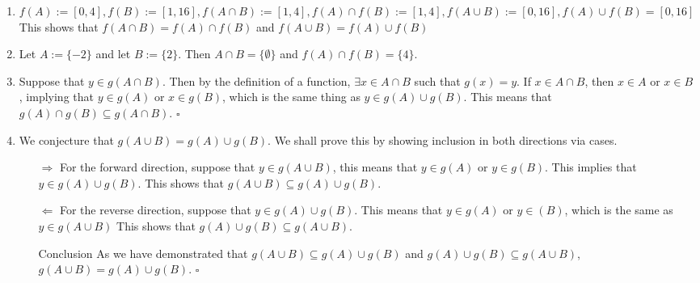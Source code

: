 \documentclass[12 pt]{article}
\newcommand{\qed}[0]{$\square$}
\begin{document}
\begin{enumerate}
    \item \(f(A) := [0, 4], f(B) := [1, 16], f(A \cap B) := [1, 4], f(A) \cap f(B) := [1, 4], f(A\cup B) := [0, 16], f(A) \cup f(B) = [0, 16]\)
    \\
    This shows that \(f(A \cap B) = f(A) \cap f(B)\) and \(f(A \cup B) = f(A) \cup f(B)\)

    \item Let \(A := \{-2\}\) and let \(B := \{2\}\). Then \(A \cap B = \{\emptyset\}\) and \(f(A) \cap f(B) = \{4\}\).
    \item Suppose that \(y \in g(A \cap B)\). Then by the definition of a function, \(\exists x \in A \cap B\) such that \(g(x) = y\). If \(x \in A \cap B\), then \(x \in A\) or \(x \in B\), implying that \(y \in g(A)\) or \(x \in g(B)\), which is the same thing as \(y \in g(A) \cup g(B)\). This means that \(g(A) \cap g(B) \subseteq g(A \cap B)\). \qed 
    \item We conjecture that \(g(A \cup B) = g(A) \cup g(B)\). We shall prove this by showing inclusion in both directions via cases.
    \begin{enumerate}
        \item[\(\Rightarrow\)] For the forward direction, suppose that \(y \in g(A \cup B)\), this means that \(y \in g(A)\) or \(y \in g(B)\). This implies that \(y \in g(A) \cup g(B)\). This shows that \(g(A \cup B) \subseteq g(A) \cup g(B)\).
        \item[\(\Leftarrow\)] For the reverse direction, suppose that \(y \in g(A) \cup g(B)\). This means that \(y \in g(A)\) or \(y \in (B)\), which is the same as \(y \in g(A \cup B)\) This shows that \(g(A) \cup g(B) \subseteq g(A \cup B)\).
        \item[Conclusion] As we have demonstrated that \(g(A \cup B) \subseteq g(A) \cup g(B)\) and \(g(A) \cup g(B) \subseteq g(A \cup B)\), \(g(A \cup B) = g(A) \cup g(B)\). \qed
    \end{enumerate}
\end{enumerate}
\end{document}
